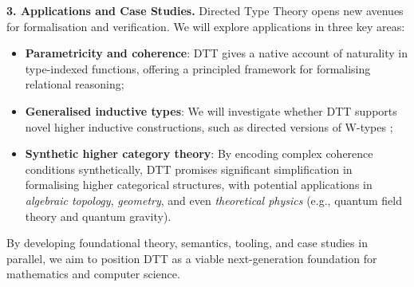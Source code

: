 \documentclass[a4paper,11pt]{article}
\renewcommand{\paragraph}[1]{\textbf{#1.}}
\begin{document}
\paragraph{3. Applications and Case Studies}
Directed Type Theory opens new avenues for formalisation and verification. We will explore applications in three key areas:
\begin{itemize}
  \item \textbf{Parametricity and coherence}: DTT gives a native account of naturality in type-indexed functions, offering a principled framework for formalising relational reasoning;
  \item \textbf{Generalised inductive types}: We will investigate whether DTT supports novel higher inductive constructions, such as directed versions of W-types \cite{altenkirch2024qits};
  \item \textbf{Synthetic higher category theory}: By encoding complex coherence conditions synthetically, DTT promises significant simplification in formalising higher categorical structures, with potential applications in \emph{algebraic topology}, \emph{geometry}, and even \emph{theoretical physics} (e.g., quantum field theory and quantum gravity).
\end{itemize}

By developing foundational theory, semantics, tooling, and case studies in parallel, we aim to position DTT as a viable next-generation foundation for mathematics and computer science.



\end{document}
